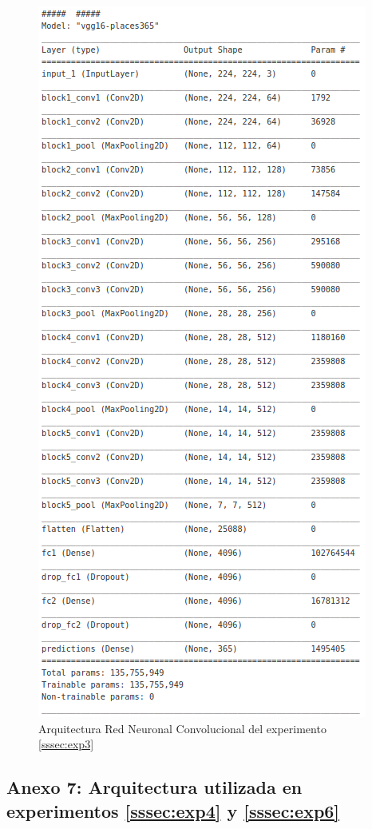 \begin{figure}[h!]
	\centering
	\includegraphics[width=0.7\linewidth]{images/architecture_exp3}
	\caption{Arquitectura Red Neuronal Convolucional del experimento \ref{sssec:exp3}}
	\label{fig:architectureexp3}
\end{figure}


\subsection{Anexo 7: Arquitectura utilizada en experimentos \ref{sssec:exp4} y \ref{sssec:exp6}}\label{ssec:anexo7}

